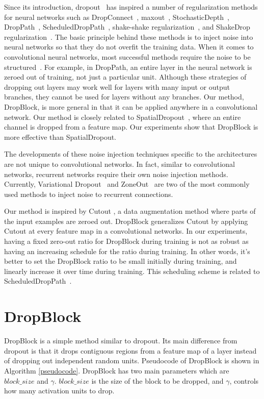 \documentclass{article}
\begin{document}
Since its introduction, dropout~\cite{dropout2014} has inspired a number of regularization methods for neural networks such as DropConnect~\cite{wan2013regularization}, maxout~\cite{goodfellow2013maxout}, StochasticDepth~\cite{huang2016deep}, DropPath~\cite{fractalnet2017},  ScheduledDropPath~\cite{zoph2017learning}, shake-shake regularization~\cite{gastaldi2017shake}, and ShakeDrop regularization~\cite{yamada2018shakedrop}. The basic principle behind these methods is to inject noise into neural networks so that they do not overfit the training data. When it comes to convolutional neural networks, most successful methods require the noise to be structured~\cite{huang2016deep,fractalnet2017,zoph2017learning,gastaldi2017shake,yamada2018shakedrop,tompson2015spatialdropout}. For example, in DropPath, an entire layer in the neural network is zeroed out of training, not just a particular unit. Although these strategies of dropping out layers may work well for layers with many input or output branches, they cannot be used for layers without any branches. Our method, DropBlock, is more general in that it can be applied anywhere in a convolutional network. Our method is closely related to SpatialDropout~\cite{tompson2015spatialdropout}, where an entire channel is dropped from a feature map. Our  experiments show that DropBlock is more effective than SpatialDropout.

The developments of these noise injection techniques specific to the architectures are not unique to convolutional networks. In fact, similar to convolutional networks, recurrent networks require their own noise injection methods. Currently, Variational Dropout~\cite{gal2016theoretically} and ZoneOut~\cite{krueger2016zoneout} are two of the most commonly used methods to inject noise to recurrent connections.   


Our method is inspired by Cutout \cite{Cutout2017}, a data augmentation method where parts of the input examples are zeroed out. DropBlock generalizes Cutout by applying Cutout at every feature map in a convolutional networks. In our experiments, having a fixed zero-out ratio for DropBlock during training is not as robust as having an increasing schedule for the ratio during training. In other words, it's better to set the DropBlock ratio to be small initially during training, and linearly increase it over time during training. This scheduling scheme is related to ScheduledDropPath~\cite{zoph2017learning}.

\section{DropBlock}
DropBlock is a simple method similar to dropout. Its main difference from dropout is that it drops contiguous regions from a feature map of a layer instead of dropping out independent random units. Pseudocode of  DropBlock is shown in Algorithm
\ref{pseudocode}.
DropBlock has two main parameters which are $block\_size$ and $\gamma$. $block\_size$ is the size of the block to be dropped, and $\gamma$, controls how many activation units to drop. 
\end{document}
